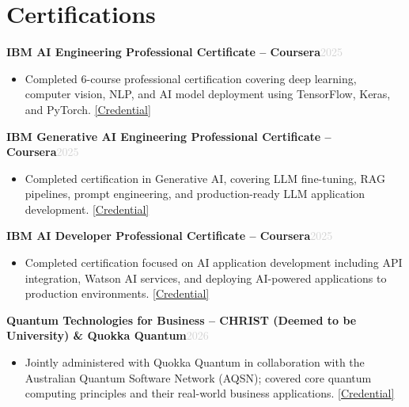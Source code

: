 \documentclass[a4paper,10.5pt]{article}
\newcommand{\resumeProject}[2]{%
  \vspace{3pt}%
  \noindent\textbf{\normalsize #1}\hfill\textcolor{lightgray}{\small #2}%
  \vspace{1pt}%
}
\newcommand{\resumeItem}[1]{%
  \item\small{#1}%
}
\newcommand{\resumeItemListStart}{%
  \begin{itemize}[leftmargin=0.18in, itemsep=1pt, topsep=2pt, parsep=0pt]%
}
\newcommand{\resumeItemListEnd}{%
  \end{itemize}\vspace{1pt}%
}
\begin{document}
\section{Certifications}

\resumeProject
  {IBM AI Engineering Professional Certificate -- Coursera}{2025}

\resumeItemListStart
  \resumeItem{
    Completed 6-course professional certification covering deep learning, computer vision, NLP, and AI model deployment using TensorFlow, Keras, and PyTorch. \href{https://www.coursera.org/account/accomplishments/professional-cert/VB5L09HRGVN4}{[Credential]}
  }
\resumeItemListEnd

\vspace{4pt}

\resumeProject
  {IBM Generative AI Engineering Professional Certificate -- Coursera}{2025}

\resumeItemListStart
  \resumeItem{
    Completed certification in Generative AI, covering LLM fine-tuning, RAG pipelines, prompt engineering, and production-ready LLM application development. \href{https://www.coursera.org/account/accomplishments/professional-cert/W9RRBKQ7I5YZ}{[Credential]}
  }
\resumeItemListEnd

\vspace{4pt}

\resumeProject
  {IBM AI Developer Professional Certificate -- Coursera}{2025}

\resumeItemListStart
  \resumeItem{
    Completed certification focused on AI application development including API integration, Watson AI services, and deploying AI-powered applications to production environments. \href{https://www.coursera.org/account/accomplishments/professional-cert/9Z5UYZMG8HPX}{[Credential]}
  }
\resumeItemListEnd

\vspace{4pt}

\resumeProject
  {Quantum Technologies for Business -- CHRIST (Deemed to be University) \& Quokka Quantum}{2026}

\resumeItemListStart
  \resumeItem{
    Jointly administered with Quokka Quantum in collaboration with the Australian Quantum Software Network (AQSN); covered core quantum computing principles and their real-world business applications. \href{https://github.com/Abhijith-E/AbhijithE_Quantum_Technologies_for_Business_Certificate_2026/blob/main/AbhijithE_Quantum_Technologies_for_Business_Certificate_2026.pdf}{[Credential]}
  }
\resumeItemListEnd

\end{document}
